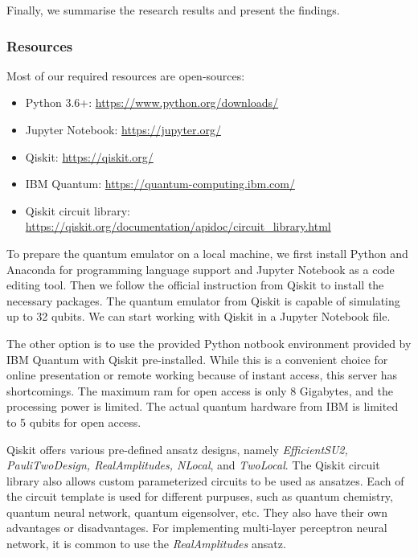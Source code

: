 Finally, we summarise the research results and present the findings.

\subsubsection{Resources} \label{Resources section}
Most of our required resources are open-sources:
\begin{itemize}
    \item Python 3.6+: \url{https://www.python.org/downloads/}
    \item Jupyter Notebook: \url{https://jupyter.org/}
    \item Qiskit: \url{https://qiskit.org/}
    \item IBM Quantum: \url{https://quantum-computing.ibm.com/}
    \item Qiskit circuit library: \url{https://qiskit.org/documentation/apidoc/circuit_library.html}
\end{itemize}

To prepare the quantum emulator on a local machine, we first install Python and Anaconda for programming language support and Jupyter Notebook as a code editing tool.
Then we follow the official instruction from Qiskit \cite{Qiskit} to install the necessary packages.
The quantum emulator from Qiskit is capable of simulating up to 32 qubits.
We can start working with Qiskit in a Jupyter Notebook file.

The other option is to use the provided Python notbook environment provided by IBM Quantum with Qiskit pre-installed.
While this is a convenient choice for online presentation or remote working because of instant access, this server has shortcomings.
The maximum ram for open access is only 8 Gigabytes, and the processing power is limited.
The actual quantum hardware from IBM is limited to 5 qubits for open access.

Qiskit offers various pre-defined ansatz designs, namely \textit{EfficientSU2, PauliTwoDesign, RealAmplitudes, NLocal}, and \textit{TwoLocal}.
The Qiskit circuit library also allows custom parameterized circuits to be used as ansatzes.
Each of the circuit template is used for different purpuses, such as quantum chemistry, quantum neural network, quantum eigensolver, etc.
They also have their own advantages or disadvantages.
For implementing multi-layer perceptron neural network, it is common to use the \textit{RealAmplitudes} ansatz.

